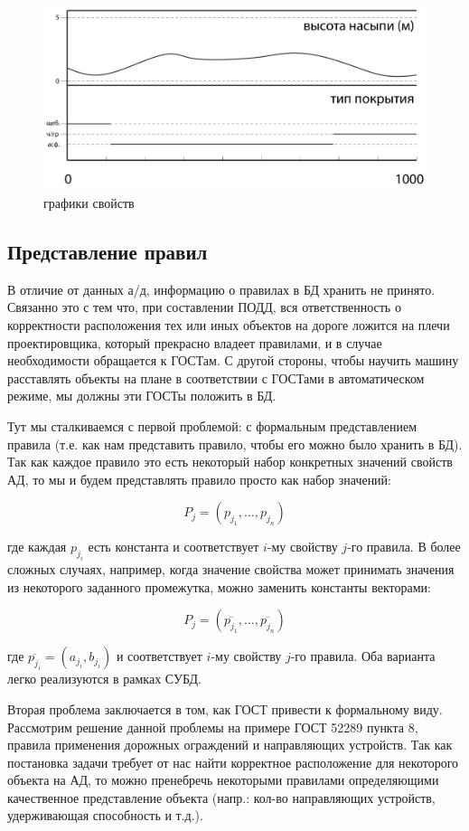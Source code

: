 \begin{figure}[h]
	\centering
	\includegraphics[scale=0.75]{images/auto_prop_graph.jpg}
	\caption{графики свойств}
	\label{auto_prop_graph}
\end{figure}
\subsection{Представление правил}
В отличие от данных а/д, информацию о правилах в БД хранить не принято. Связанно это с тем что, при составлении ПОДД, вся ответственность о корректности расположения тех или иных объектов на дороге ложится на плечи проектировщика, который прекрасно владеет правилами, и в случае необходимости обращается к ГОСТам. С другой стороны, чтобы научить машину расставлять объекты на плане в соответствии с ГОСТами в автоматическом режиме, мы должны эти ГОСТы положить в БД. 

Тут мы сталкиваемся с первой проблемой: с формальным представлением правила (т.е. как нам представить правило, чтобы его можно было хранить в БД). Так как каждое правило это есть некоторый набор конкретных значений свойств АД, то мы и будем представлять правило просто как набор значений:

$$
P_j = (p_{j_1}, \dots, p_{j_n})
$$

где каждая $p_{j_i}$ есть константа и соответствует $i$-му свойству $j$-го правила. В более сложных случаях, например, когда значение свойства может принимать значения из некоторого заданного промежутка, можно заменить константы векторами:

$$
P_j = (\overline{p_{j_1}}, \dots, \overline{p_{j_n}})
$$

где $\overline{p_{j_i}} = (a_{j_i}, b_{j_i})$ и соответствует $i$-му свойству $j$-го правила. Оба варианта легко реализуются в рамках СУБД. 


Вторая проблема заключается в том, как ГОСТ привести к формальному виду. Рассмотрим решение данной проблемы на примере ГОСТ 52289 пункта 8, правила применения дорожных ограждений и направляющих устройств. Так как постановка задачи требует от нас найти корректное расположение для некоторого объекта на АД, то можно пренебречь некоторыми правилами  определяющими качественное представление объекта (напр.: кол-во направляющих устройств, удерживающая способность и т.д.). 

